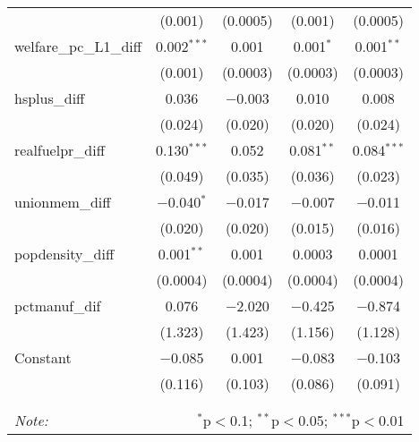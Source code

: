 \begin{table}[!htbp]
\begin{tabular}{@{\extracolsep{5pt}}lcccc}
  & (0.001) & (0.0005) & (0.001) & (0.0005) \\ 
  welfare\_pc\_L1\_diff & 0.002$^{***}$ & 0.001 & 0.001$^{*}$ & 0.001$^{**}$ \\ 
  & (0.001) & (0.0003) & (0.0003) & (0.0003) \\ 
  hsplus\_diff & 0.036 & $-$0.003 & 0.010 & 0.008 \\ 
  & (0.024) & (0.020) & (0.020) & (0.024) \\ 
  realfuelpr\_diff & 0.130$^{***}$ & 0.052 & 0.081$^{**}$ & 0.084$^{***}$ \\ 
  & (0.049) & (0.035) & (0.036) & (0.023) \\ 
  unionmem\_diff & $-$0.040$^{*}$ & $-$0.017 & $-$0.007 & $-$0.011 \\ 
  & (0.020) & (0.020) & (0.015) & (0.016) \\ 
  popdensity\_diff & 0.001$^{**}$ & 0.001 & 0.0003 & 0.0001 \\ 
  & (0.0004) & (0.0004) & (0.0004) & (0.0004) \\ 
  pctmanuf\_dif & 0.076 & $-$2.020 & $-$0.425 & $-$0.874 \\ 
  & (1.323) & (1.423) & (1.156) & (1.128) \\ 
  Constant & $-$0.085 & 0.001 & $-$0.083 & $-$0.103 \\ 
  & (0.116) & (0.103) & (0.086) & (0.091) \\ 
 \hline \\[-1.8ex] 
\hline 
\hline \\[-1.8ex] 
\textit{Note:}  & \multicolumn{4}{r}{$^{*}$p$<$0.1; $^{**}$p$<$0.05; $^{***}$p$<$0.01} \\ 
\end{tabular} 
\end{table} 
